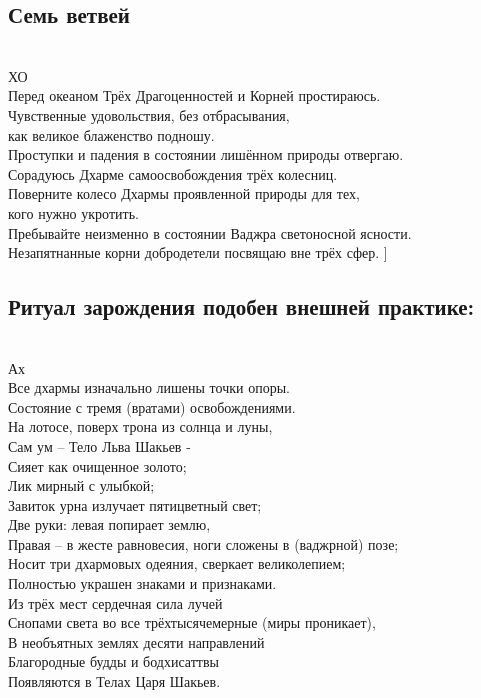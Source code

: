 \subsection*{Семь ветвей}
\\

ХО\\
Перед океаном Трёх Драгоценностей и Корней простираюсь.\\
Чувственные удовольствия, без отбрасывания, \\ \indent как великое блаженство подношу.\\
Проступки и падения в состоянии лишённом природы отвергаю.\\
Сорадуюсь Дхарме самоосвобождения трёх колесниц.\\
Поверните колесо Дхармы проявленной природы для тех, \\ \indent кого нужно укротить.\\
Пребывайте неизменно в состоянии Ваджра светоносной ясности.\\
Незапятнанные корни добродетели посвящаю вне трёх сфер. ]\\

\subsection*{Ритуал зарождения подобен внешней практике:}
\\
Ах\\
Все дхармы изначально лишены точки опоры.\\
Состояние с тремя (вратами) освобождениями.\\
На лотосе, поверх трона из солнца и луны,\\
Сам ум – Тело Льва Шакьев - \\
Сияет как очищенное золото;\\
Лик мирный с улыбкой;\\
Завиток урна излучает пятицветный свет;\\
Две руки: левая попирает землю,\\
Правая – в жесте равновесия, ноги сложены в (ваджрной) позе;\\
Носит три дхармовых одеяния, сверкает великолепием;\\
Полностью украшен знаками и признаками.\\
Из трёх мест сердечная сила лучей \\
Снопами света во все трёхтысячемерные (миры проникает),\\
В необъятных землях десяти направлений\\
Благородные будды и бодхисаттвы\\
Появляются в Телах Царя Шакьев.\\
\newpage
